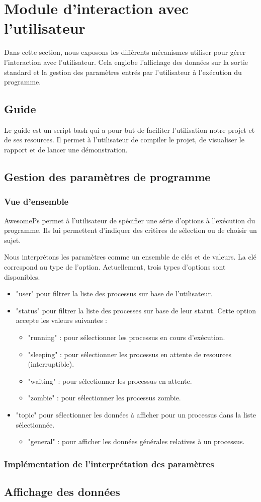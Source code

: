 \section{Module d'interaction avec l’utilisateur}
Dans cette section, nous exposons les différents mécanismes utiliser pour gérer l’interaction avec l’utilisateur. Cela englobe l’affichage des données sur la sortie standard et la gestion des paramètres entrés par l’utilisateur à l’exécution du programme.

\subsection{Guide}
Le guide est un script bash qui a pour but de faciliter l'utilisation notre projet et de ses resources. Il permet à l'utilisateur de compiler le projet, de visualiser le rapport et de lancer une démonstration.

\subsection{Gestion des paramètres de programme}
\subsubsection{Vue d'ensemble}
AwesomePs permet à l'utilisateur de spécifier une série d'options à l'exécution du programme. Ils lui permettent d'indiquer des critères de sélection ou de choisir un sujet.

Nous interprétons les paramètres comme un ensemble de clés et de valeurs. La clé correspond au type de l'option. Actuellement, trois types d'options sont disponibles.

\begin{itemize}
\item "user" pour filtrer la liste des processus sur base de l'utilisateur.
\item "status" pour filtrer la liste des processes sur base de leur statut. Cette option accepte les valeurs suivantes :
    \begin{itemize}
        \item "running" : pour sélectionner les processus en cours d'exécution.
        \item "sleeping" : pour sélectionner les processus en attente de resources (interruptible).
        \item "waiting" : pour sélectionner les processus en attente.
        \item "zombie" : pour sélectionner les processus zombie.
    \end{itemize}
\item "topic" pour sélectionner les données à afficher pour un processus dans la liste sélectionnée.
    \begin{itemize}
        \item "general" : pour afficher les données générales relatives à un processus.
    \end{itemize}
\end{itemize}

\subsubsection{Implémentation de l'interprétation des paramètres}


\subsection{Affichage des données}